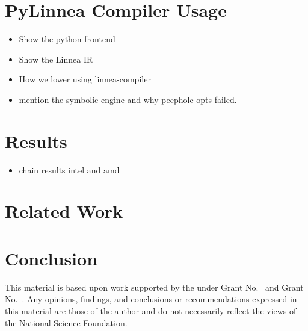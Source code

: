 \documentclass[conference]{IEEEtran}
\begin{document}
\section{PyLinnea Compiler Usage}
\begin{itemize}
  \item Show the python frontend
  \item Show the Linnea IR
  \item How we lower using linnea-compiler
  \item mention the symbolic engine and why peephole opts failed.
\end{itemize}

\section{Results}
\begin{itemize}
  \item chain results intel and amd
\end{itemize}

\section{Related Work}

\section{Conclusion}

\ifx\paperversion\paperversioncameraIEEE
\else
\begin{acks}                            %
  This material is based upon work supported by the
   under Grant
  No.~ and Grant
  No.~.  Any opinions, findings, and
  conclusions or recommendations expressed in this material are those
  of the author and do not necessarily reflect the views of the
  National Science Foundation.
\end{acks}
\fi

%
\end{document}
